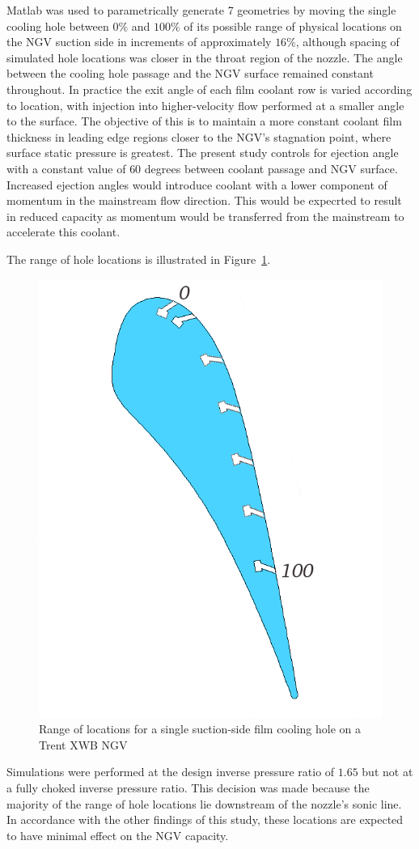 \documentclass[a4paper, 11pt, oneside]{report}
\begin{document}
Matlab was used to parametrically generate 7 geometries by moving the single cooling hole between $0\%$ and $100\%$ of its possible range of physical locations on the NGV suction side in increments of approximately $16\%$, although spacing of simulated hole locations was closer in the throat region of the nozzle. The angle between the cooling hole passage and the NGV surface remained constant throughout. In practice the exit angle of each film coolant row is varied according to location, with injection into higher-velocity flow performed at a smaller angle to the surface. The objective of this is to maintain a more constant coolant film thickness in leading edge regions closer to the NGV's stagnation point, where surface static pressure is greatest. The present study controls for ejection angle with a constant value of $60$ degrees between coolant passage and NGV surface. Increased ejection angles would introduce coolant with a lower component of momentum in the mainstream flow direction. This would be expecrted to result in reduced capacity as momentum would be transferred from the mainstream to accelerate this coolant.

The range of hole locations is illustrated in Figure~\ref{fig:SCH_hole_range}.

\begin{figure}[H]
	\centering
	\includegraphics[width=.45\textwidth]{figs/SCH_hole_range.png}
	\caption{Range of locations for a single suction-side film cooling hole on a Trent XWB NGV}
    \label{fig:SCH_hole_range}
\end{figure}

Simulations were performed at the design inverse pressure ratio of $1.65$ but not at a fully choked inverse pressure ratio. This decision was made because the majority of the range of hole locations lie downstream of the nozzle's sonic line. In accordance with the other findings of this study, these locations are expected to have minimal effect on the NGV capacity.
\end{document}
